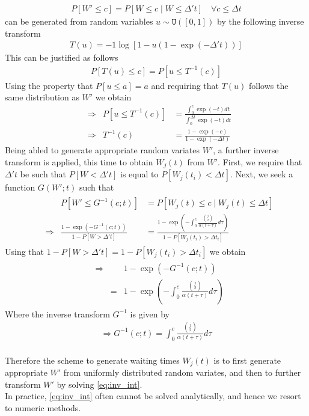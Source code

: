 \documentclass{ieeeaccess}
\theoremstyle{definition}
\begin{document}
\begin{gather}
  P[W' \leq c] = P[W\leq c\mid W\leq\Delta' t] \quad\forall c \leq \Delta t
\end{gather}
can be generated from random variables $u \sim \texttt{U}([0,1])$ by the following inverse transform
\begin{gather}
T(u) = -1\log[1-u(1-\exp(-\Delta' t))]
\end{gather} 
This can be justified as follows
\begin{gather*}
  P[T(u)\leq c] = P[u\leq T^{-1}(c)]
\end{gather*}
Using the property that $P[u\leq a] = a$ and requiring that $T(u)$ follows the same distribution as $W'$ we obtain
\begin{align*}
  &\Rightarrow& P[u\leq T^{-1}(c)] &= \frac{\int_0^c\exp(- t)dt}{\int_0^{\Delta t}\exp(- t)dt}\\
  &\Rightarrow& T^{-1}(c) &= \frac{1-\exp(- c)}{1-\exp(- \Delta t)}
\end{align*}
Being abled to generate appropriate random variates $W'$, a further inverse transform is applied, this time to obtain $W_j(t)$ from $W'$. First, we require that $\Delta' t$ be such that $P[W < \Delta' t]$ is equal to $P[W_j(t_i) < \Delta t]$. Next, we seek a function $G(W';t)$ such that
\begin{gather}
\begin{aligned}
&&P[W' \leq G^{-1}(c;t)] &= P[W_j(t) \leq c \mid W_j(t)\leq\Delta t]\\
&\Rightarrow& \frac{1-\exp(-G^{-1}(c;t))}{1-P[W > \Delta't]} &= \frac{1-\exp(-\int_{0}^{c}{\frac{\binom{j}{2}}{\alpha(t+\tau)}d\tau})}{1-P[W_j(t_i) > \Delta t_i]}
\end{aligned}
\end{gather}
Using that $1-P[W > \Delta't] = 1-P[W_j(t_i) > \Delta t_i]$ we obtain
\begin{gather}
\begin{aligned}
&\Rightarrow& &1-\exp(-G^{-1}(c;t))\\
&&=&  1-\exp(-\int_{0}^{c}{\frac{\binom{j}{2}}{\alpha(t+\tau)}d\tau})
\end{aligned}
\end{gather}
Where the inverse transform $G^{-1}$ is given by
\begin{gather}
\Rightarrow G^{-1}(c;t) = \int_{0}^{c}{\frac{\binom{j}{2}}{\alpha(t+\tau)}d\tau}\label{eq:inv_int}
\end{gather}\\
Therefore the scheme to generate waiting times $W_j(t)$ is to first generate appropriate $W'$ from uniformly distributed random variates, and then to further transform $W'$ by solving \ref{eq:inv_int}.\\
In practice, \ref{eq:inv_int} often cannot be solved analytically, and hence we resort to numeric methods.
\end{document}
